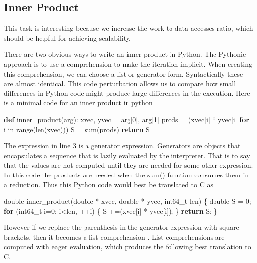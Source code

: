 \documentclass[]{IEEEtran}
\newenvironment{Shaded}{}{}
\newcommand{\KeywordTok}[1]{\textcolor[rgb]{0.00,0.44,0.13}{\textbf{{#1}}}}
\newcommand{\DataTypeTok}[1]{\textcolor[rgb]{0.56,0.13,0.00}{{#1}}}
\newcommand{\DecValTok}[1]{\textcolor[rgb]{0.25,0.63,0.44}{{#1}}}
\newcommand{\NormalTok}[1]{{#1}}
\begin{document}
\subsection{Inner Product}

This task is interesting because we increase the work to data accesses
ratio, which should be helpful for achieving scalability.

There are two obvious ways to write an inner product in Python. The
Pythonic approach is to use a comprehension to make the iteration
implicit. When creating this comprehension, we can choose a list or
generator form. Syntactically these are almost identical. This code
perturbation allows us to compare how small differences in Python code
might produce large differences in the execution. Here is a minimal code
for an inner product in python

\begin{Shaded}
\begin{Highlighting}[numbers=left,,]
\KeywordTok{def} \NormalTok{inner_product(arg):}
    \NormalTok{xvec, yvec = arg[}\DecValTok{0}\NormalTok{], arg[}\DecValTok{1}\NormalTok{]}
    \NormalTok{prods = (xvec[i] * yvec[i] }
              \KeywordTok{for} \NormalTok{i in }\DataTypeTok{range}\NormalTok{(}\DataTypeTok{len}\NormalTok{(xvec)))}
    \NormalTok{S = }\DataTypeTok{sum}\NormalTok{(prods)}
    \KeywordTok{return} \NormalTok{S}
\end{Highlighting}
\end{Shaded}
The expression in line 3 is a generator expression. Generators are
objects that encapsulates a sequence that is lazily evaluated by the
interpreter\cite{pep289}. That is to say that the values are not
computed until they are needed for some other expression. In this code
the products are needed when the sum() function consumes them in a
reduction. Thus this Python code would best be translated to C as:

\begin{Shaded}
\begin{Highlighting}[numbers=left,,]
\DataTypeTok{double} \NormalTok{inner_product(}\DataTypeTok{double} \NormalTok{* xvec,}
                     \DataTypeTok{double} \NormalTok{* yvec,}
                     \DataTypeTok{int64_t} \NormalTok{len)}
\NormalTok{\{}
    \DataTypeTok{double} \NormalTok{S = }\DecValTok{0}\NormalTok{;}
    \KeywordTok{for} \NormalTok{(}\DataTypeTok{int64_t} \NormalTok{i=}\DecValTok{0}\NormalTok{; i<len, ++i)}
    \NormalTok{\{}
        \NormalTok{S +=(xvec[i] * yvec[i]);}
    \NormalTok{\}}
    \KeywordTok{return} \NormalTok{S;}
\NormalTok{\}}
\end{Highlighting}
\end{Shaded}
However if we replace the parenthesis in the generator expression with
square brackets, then it becomes a list comprehension \cite{pep209}.
List comprehensions are computed with eager evaluation, which produces
the following best translation to C.
\end{document}
